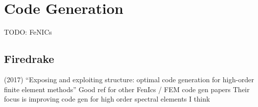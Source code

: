 \section{Code Generation}

TODO: FeNICs

\subsection{Firedrake}

\begin{outline}
\1 (2017) ``Exposing and exploiting structure: optimal code generation for high-order finite element methods'' \cite{homolya2017exposing}
\2 Good ref for other FenIcs / FEM code gen papers
\2 Their focus is improving code gen for high order spectral elements I think
\end{outline}
